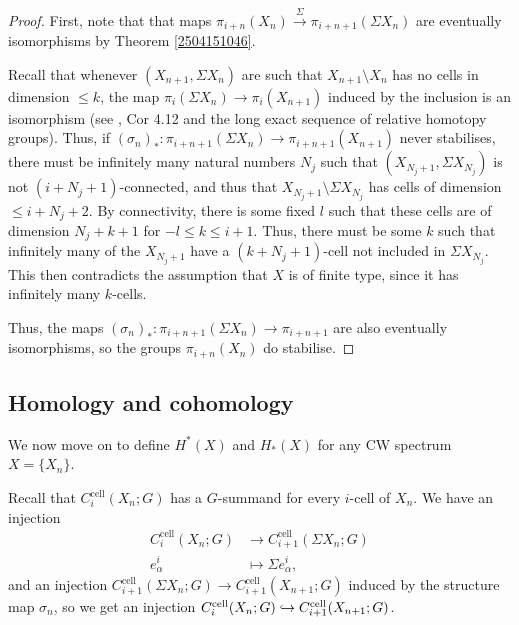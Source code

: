 \documentclass[11pt, titlepage]{article} %
\def\inj{\ensuremath\hookrightarrow}
\numberwithin{equation}{subsection}
\theoremstyle{plain}
\theoremstyle{definition}
\begin{document}
\begin{proof}
First, note that that maps \(\pi_{i+n}(X_n) \xrightarrow{\Sigma} \pi_{i+n+1}(\Sigma X_n)\) are eventually isomorphisms by Theorem \ref{2504151046}. 

Recall that whenever \((X_{n+1}, \Sigma X_n)\) are such that \(X_{n+1}\setminus X_n\) has no cells in dimension \(\leq k\), the map \(\pi_i(\Sigma X_n)\to \pi_i(X_{n+1})\) induced by the inclusion is an isomorphism (see \autocite{hatcher}, Cor 4.12 and the long exact sequence of relative homotopy groups). Thus, if \((\sigma_n)_* : \pi_{i+n+1}(\Sigma X_n)\to \pi_{i+n+1}(X_{n+1})\) never stabilises, there must be infinitely many natural numbers \(N_j\) such that \((X_{N_j+1}, \Sigma X_{N_j})\) is not \((i+N_j+1)\)-connected, and thus that \(X_{N_j+1}\setminus \Sigma X_{N_j}\) has cells of dimension \(\leq i+N_j+2\). By connectivity, there is some fixed \(l\) such that these cells are of dimension \(N_j+k+1\) for \(-l\leq k \leq i+1\). Thus, there must be some \(k\) such that infinitely many of the \(X_{N_j+1}\) have a \((k+N_j+1)\)-cell not included in \(\Sigma X_{N_j}\). This then contradicts the assumption that \(X\) is of finite type, since it has infinitely many \(k\)-cells. 

Thus, the maps \((\sigma_n)_* : \pi_{i+n+1}(\Sigma X_n)\to \pi_{i+n+1}\) are also eventually isomorphisms, so the groups \(\pi_{i+n}(X_n)\) do stabilise.
\end{proof}

\subsection{Homology and cohomology}


We now move on to define \(H^*(X)\) and \(H_*(X)\) for any CW spectrum \(X=\{X_n\}\).

Recall that \(C^\text{cell}_i(X_n; G)\) has a \(G\)-summand for every \(i\)-cell of \(X_n\). We have an injection
\begin{align*}
C_i^\text{cell}(X_n;G) &\to C_{i+1}^\text{cell}(\Sigma X_n; G)\\
e^i_\alpha &\mapsto \Sigma e^i_\alpha,
\end{align*}
and an injection \(C^\text{cell}_{i+1}(\Sigma X_n; G)\to C^\text{cell}_{i+1}(X_{n+1}; G)\) induced by the structure map \(\sigma_n\), so we get an injection \(C^\text{cell}_i(X_n;G)\inj C^\text{cell}_{i+1}(X_{n+1};G)\).
\end{document}
